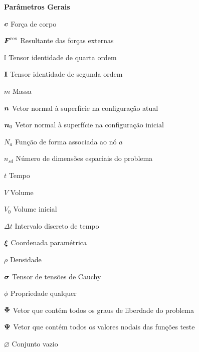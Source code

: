 \begin{simbolos}
    \item[\textbf{Parâmetros Gerais}]
    \item[$\boldsymbol{c}$] Força de corpo
    \item[$\boldsymbol{F}^\mathrm{res}$] Resultante das forças externas
    \item[$\mathbb{I}$] Tensor identidade de quarta ordem
    \item[$\mathbf{I}$] Tensor identidade de segunda ordem
    \item[$m$] Massa
    \item[$\boldsymbol{n}$] Vetor normal à superfície na configuração atual
    \item[$\boldsymbol{n}_0$] Vetor normal à superfície na configuração inicial
    \item[$N_a$] Função de forma associada ao nó $a$
    \item[$n_{sd}$] Número de dimensões espaciais do problema
    \item[$t$] Tempo
    \item[$V$] Volume
    \item[$V_0$] Volume inicial
    \item[$\Delta t$] Intervalo discreto de tempo
    \item[$\boldsymbol{\xi}$] Coordenada paramétrica
    \item[$\rho$] Densidade
    \item[$\boldsymbol{\sigma}$] Tensor de tensões de Cauchy
    \item[$\phi$] Propriedade qualquer
    \item[$\boldsymbol{\Phi}$] Vetor que contém todos os graus de liberdade do problema
    \item[$\boldsymbol{\Psi}$] Vetor que contém todos os valores nodais das funções teste
    \item[$\varnothing$] Conjunto vazio


\end{simbolos}
